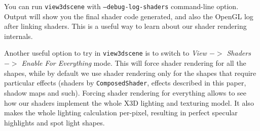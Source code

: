\documentclass{acmsiggraph}                     %
\newcommand*{\myhref}[2]{\texttt{\href{#1}{\nolinkurl{#2}}}}
\begin{document}
You can run \texttt{view3dscene} with \texttt{--debug-log-shaders} command-line
option. Output will show you the final shader code generated,
and also the OpenGL log after linking shaders.
This is a useful way to learn about our shader rendering internals.

Another useful option to try in \texttt{view3dscene} is to switch to
\textit{View $->$ Shaders $->$ Enable For Everything} mode.
This will force shader rendering for all the shapes,
while by default we use shader rendering only for the shapes that
require particular effects (shaders by \texttt{ComposedShader}, effects
described in this paper, shadow maps and such).
Forcing shader rendering for everything allows to see
how our shaders implement the whole X3D lighting and texturing model.
It also makes the whole lighting calculation per-pixel, resulting
in perfect specular highlights and spot light shapes.




\end{document}
